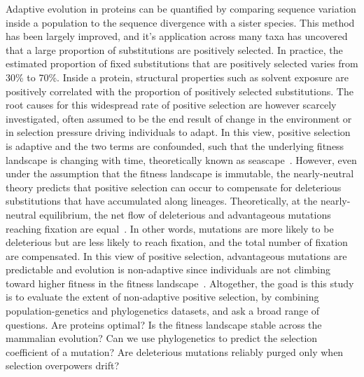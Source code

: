 \documentclass{article}
\begin{document}
    Adaptive evolution in proteins can be quantified by comparing sequence variation inside a population to the sequence divergence with a sister species\cite{mcdonald_adaptative_1991}.
    This method has been largely improved\cite{eyre-walker_distribution_2006, eyre-walker_estimating_2009, galtier_adaptive_2016, tataru_inference_2017}, and it's application across many taxa has uncovered that a large proportion of substitutions are positively selected\cite{moutinho_variation_2019}.
    In practice, the estimated proportion of fixed substitutions that are positively selected varies from 30\% to 70\%.
    Inside a protein, structural properties such as solvent exposure are positively correlated with the proportion of positively selected substitutions\cite{moutinho_impact_2019}.
    The root causes for this widespread rate of positive selection are however scarcely investigated, often assumed to be the end result of change in the environment or in selection pressure driving individuals to adapt.
    In this view, positive selection is adaptive and the two terms are confounded, such that the underlying fitness landscape is changing with time, theoretically known as seascape~\cite{mustonen_fitness_2009}.
    However, even under the assumption that the fitness landscape is immutable, the nearly-neutral theory\cite{ohta_nearly_1992} predicts that positive selection can occur to compensate for deleterious substitutions that have accumulated along lineages.
    Theoretically, at the nearly-neutral equilibrium, the net flow of deleterious and advantageous mutations reaching fixation are equal~\cite{sella_application_2005}.
    In other words, mutations are more likely to be deleterious but are less likely to reach fixation, and the total number of fixation are compensated.
    In this view of positive selection, advantageous mutations are predictable and evolution is non-adaptive since individuals are not climbing toward higher fitness in the fitness landscape~\cite{lassig_predicting_2017}.
    Altogether, the goad is this study is to evaluate the extent of non-adaptive positive selection, by combining population-genetics and phylogenetics datasets, and ask a broad range of questions.
    Are proteins optimal?
    Is the fitness landscape stable across the mammalian evolution?
    Can we use phylogenetics to predict the selection coefficient of a mutation?
    Are deleterious mutations reliably purged only when selection overpowers drift?
\end{document}

